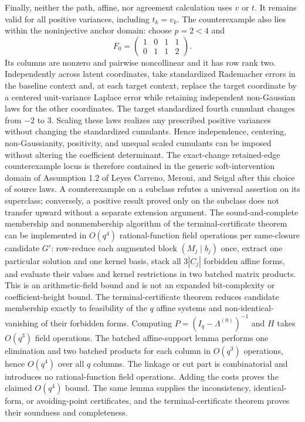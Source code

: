Finally, neither the path, affine, nor agreement calculation uses \(v\) or \(t\).  It remains valid for all positive variances, including \(t_k=v_k\).  The counterexample also lies within the noninjective anchor domain: choose \(p=2<4\) and
\[
 F_0=\begin{pmatrix}1&0&1&1\\0&1&1&2\end{pmatrix}.
\]
Its columns are nonzero and pairwise noncollinear and it has row rank two.  Independently across latent coordinates, take standardized Rademacher errors in the baseline context and, at each target context, replace the target coordinate by a centered unit-variance Laplace error while retaining independent non-Gaussian laws for the other coordinates.  The target standardized fourth cumulant changes from \(-2\) to \(3\).  Scaling these laws realizes any prescribed positive variances without changing the standardized cumulants.  Hence independence, centering, non-Gaussianity, positivity, and unequal scaled cumulants can be imposed without altering the coefficient determinant.  The exact-change retained-edge counterexample locus is therefore contained in the generic soft-intervention domain of Assumption 1.2 of Leyes Carreno, Meroni, and Seigal after this choice of source laws.  A counterexample on a subclass refutes a universal assertion on its superclass; conversely, a positive result proved only on the subclass does not transfer upward without a separate extension argument.
The sound-and-complete membership and nonmembership algorithm of the terminal-certificate theorem can be implemented in \(O(q^4)\) rational-function field operations per same-closure candidate \(G'\): row-reduce each augmented block \((M_j\mid b_j)\) once, extract one particular solution and one kernel basis, stack all \(3|C_j|\) forbidden affine forms, and evaluate their values and kernel restrictions in two batched matrix products.  This is an arithmetic-field bound and is not an expanded bit-complexity or coefficient-height bound.
The terminal-certificate theorem reduces candidate membership exactly to feasibility of the \(q\) affine systems and non-identical-vanishing of their forbidden forms.  Computing \(P=(I_q-\Lambda^{(0)})^{-1}\) and \(H\) takes \(O(q^3)\) field operations.  The batched affine-support lemma performs one elimination and two batched products for each column in \(O(q^3)\) operations, hence \(O(q^4)\) over all \(q\) columns.  The linkage or cut part is combinatorial and introduces no rational-function field operations.  Adding the costs proves the claimed \(O(q^4)\) bound.  The same lemma supplies the inconsistency, identical-form, or avoiding-point certificates, and the terminal-certificate theorem proves their soundness and completeness.
